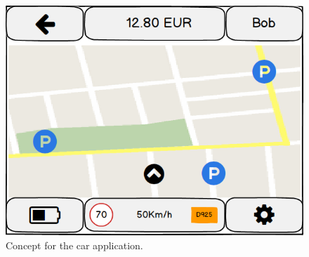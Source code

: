 \begin{figure}[H]
	\centering
	\includegraphics[width=\textwidth]{mockup/VehicleApplicationNavigator.png}
	\caption{Concept for the car application.}
\end{figure}

